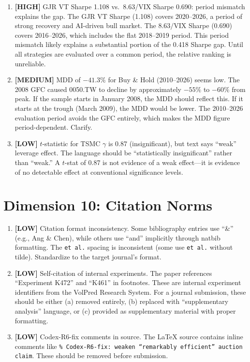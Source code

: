\documentclass[12pt,a4paper]{article}
\newcommand{\HIGH}[1]{\textcolor{errorred}{\textbf{[HIGH]} #1}}
\newcommand{\MEDIUM}[1]{\textcolor{warncolor}{\textbf{[MEDIUM]} #1}}
\newcommand{\LOW}[1]{\textcolor{infocolor}{\textbf{[LOW]} #1}}
\begin{document}
\begin{enumerate}[leftmargin=2em]

\item \HIGH{GJR VT Sharpe 1.108 vs.\ 8.63/VIX Sharpe 0.690: period mismatch explains the gap.} The GJR VT Sharpe (1.108) covers 2020--2026, a period of strong recovery and AI-driven bull market. The $8.63/\text{VIX}$ Sharpe (0.690) covers 2016--2026, which includes the flat 2018--2019 period. This period mismatch likely explains a substantial portion of the 0.418 Sharpe gap. Until all strategies are evaluated over a common period, the relative ranking is unreliable.

\item \MEDIUM{MDD of $-41.3\%$ for Buy \& Hold (2010--2026) seems low.} The 2008 GFC caused 0050.TW to decline by approximately $-55\%$ to $-60\%$ from peak. If the sample starts in January 2008, the MDD should reflect this. If it starts at the trough (March 2009), the MDD would be lower. The 2010--2026 evaluation period avoids the GFC entirely, which makes the MDD figure period-dependent. Clarify.

\item \LOW{$t$-statistic for TSMC $\gamma$ is 0.87 (insignificant), but text says ``weak'' leverage effect.} The language should be ``statistically insignificant'' rather than ``weak.'' A $t$-stat of 0.87 is not evidence of a weak effect---it is evidence of no detectable effect at conventional significance levels.

\end{enumerate}

\section{Dimension 10: Citation Norms}

\begin{enumerate}[leftmargin=2em]

\item \LOW{Citation format inconsistency.} Some bibliography entries use ``\&'' (e.g., Ang \& Chen), while others use ``and'' implicitly through natbib formatting. The \texttt{et~al.} spacing is inconsistent (some use \texttt{et al.} without tilde). Standardize to the target journal's format.

\item \LOW{Self-citation of internal experiments.} The paper references ``Experiment K472'' and ``K461'' in footnotes. These are internal experiment identifiers from the VolPred Research System. For a journal submission, these should be either (a) removed entirely, (b) replaced with ``supplementary analysis'' language, or (c) provided as supplementary material with proper formatting.

\item \LOW{Codex-R6-fix comments in source.} The LaTeX source contains inline comments like \texttt{\% Codex-R6-fix: weaken ``remarkably efficient'' auction claim}. These should be removed before submission.

\end{enumerate}
\end{document}
